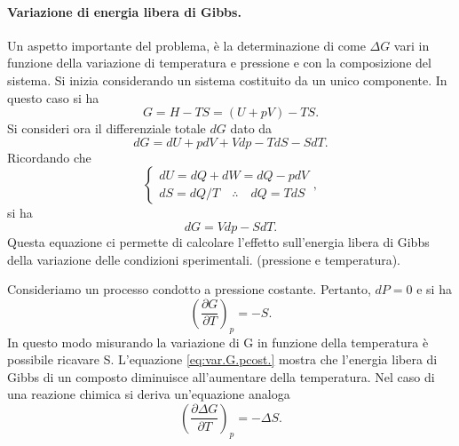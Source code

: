 \paragraph{Variazione di energia libera di Gibbs.} Un aspetto importante del problema, è la determinazione di come $\Delta G$ vari in funzione della variazione di temperatura e pressione e con la composizione del sistema. Si inizia considerando un sistema costituito da un unico componente. In questo caso si ha
\begin{equation}
    G=H-TS=(U+pV)-TS.
\end{equation}
Si consideri ora il differenziale totale $dG$ dato da
\begin{equation}
    dG=dU+pdV+Vdp-TdS-SdT.
\end{equation}
Ricordando che 
\begin{equation}
    \begin{cases}
        dU=dQ+dW=dQ-pdV \\
        dS=dQ/T\quad\therefore\quad dQ=TdS
    \end{cases},
\end{equation}
si ha
\begin{equation}\label{eq:diff.en.libera}
    dG=Vdp-SdT.
\end{equation}
Questa equazione ci permette di calcolare l'effetto sull'energia libera di Gibbs della variazione delle condizioni sperimentali. (pressione e temperatura).
\begin{caso}
        Consideriamo un processo condotto a pressione costante. Pertanto, $dP=0$ e si ha
        \begin{equation}\label{eq:var.G.pcost.}
            \left(\frac{\partial G}{\partial T}\right)_p=-S.
        \end{equation}
        In questo modo misurando la variazione di G in funzione della temperatura è possibile ricavare S. L'equazione \eqref{eq:var.G.pcost.} mostra che l'energia libera di Gibbs di un composto diminuisce all'aumentare della temperatura. Nel caso di una reazione chimica si deriva un'equazione analoga
        \begin{equation}
            \left(\frac{\partial\Delta G}{\partial T}\right)_p=-\Delta S.
        \end{equation}
\end{caso}
